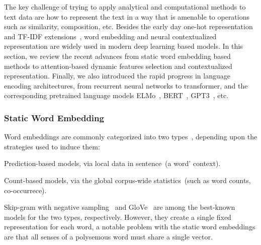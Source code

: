 The key challenge of trying to apply analytical and computational
methods to text data are how to represent the text in a way that is
amenable to operations such as similarity, composition, etc. Besides
the early day one-hot representation and TF-IDF
extensions~\citep{jones1972statistical}, word embedding and neural
contextualized representation are widely used in modern deep learning
based models. In this section, we review the recent advances from
static word embedding based methods to attention-based dynamic
features selection and contextualized representation. Finally, we also
introduced the rapid progress in language encoding architectures, from
recurrent neural networks to transformer, and the corresponding
pretrained language models ELMo~\citep{elmo},
BERT~\citep{devlin2018bert}, GPT3~\cite{brown2020language}, etc.

\subsubsection{Static Word Embedding}
\label{sssec:bg:static-embedding}
Word embeddings are commonly categorized into two
types~\citep{Baroni:2014,pennington2014glove,li2015generative},
depending upon the strategies used to induce them:
\begin{inparaenum}[(1)]
\item Prediction-based models, via local data in sentence~(a word'
  context).
\item Count-based models, via the global corpus-wide statistics~(such
  as word counts, co-occurrece).
\end{inparaenum}

Skip-gram with negative sampling~\cite[SGNS,][]{mikolov13w2v} and
GloVe~\cite{pennington2014glove} are among the best-known models for
the two types, respectively. However, they create a single fixed
representation for each word, a notable problem with the static word
embeddings are that all senses of a polysemous word must share a single
vector.

